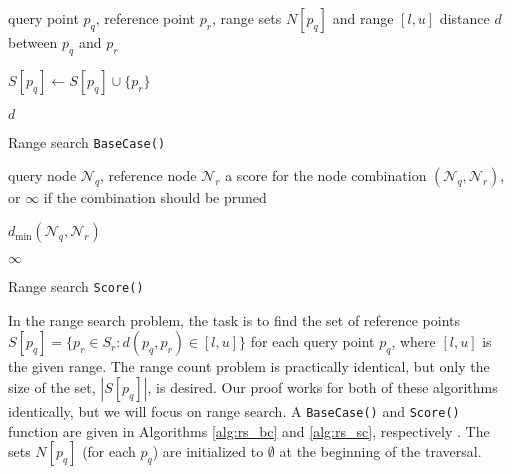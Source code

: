 \begin{algorithm}[tb]
\begin{algorithmic}[1]
     query point $p_q$, reference point $p_r$, range
sets $N[p_q]$ and range $[l, u]$
     distance $d$ between $p_q$ and $p_r$


    \STATE  $S[p_q] \gets S[p_q] \cup \{ p_r \}$
    \ENDIF

    \RETURN $d$
  \end{algorithmic}
  \caption{Range search \texttt{BaseCase()}}
  \label{alg:rs_bc}
\end{algorithm}

\begin{algorithm}[tb]
  \begin{algorithmic}[1]
     query node $\mathscr{N}_q$, reference node
$\mathscr{N}_r$
     a score for the node combination $(\mathscr{N}_q,
\mathscr{N}_r)$, or $\infty$ if the combination should be pruned

    \medskip

      \RETURN $d_{\min}(\mathscr{N}_q, \mathscr{N}_r)$
    \ENDIF

    \RETURN $\infty$
  \end{algorithmic}
  \caption{Range search \texttt{Score()}}
  \label{alg:rs_sc}
\end{algorithm}

In the range search problem, the task is to find the set of reference points
$S[p_q] = \{ p_r \in S_r : d(p_q, p_r) \in [l, u] \}$
for each query point $p_q$, where $[l, u]$ is the given
range.  The range count problem is practically identical, but only the size of
the set, $|S[p_q]|$, is desired.
Our proof works for both of these algorithms
identically, but we will focus on range search.  A \texttt{BaseCase()} and
\texttt{Score()} function are given in Algorithms \ref{alg:rs_bc} and
\ref{alg:rs_sc}, respectively \citep[a correctness proof can be found
in][]{curtin2013tree}.  The sets $N[p_q]$ (for each $p_q$) are
initialized to $\emptyset$ at the beginning of the traversal.

